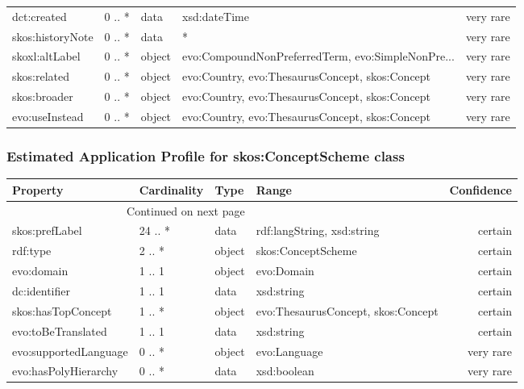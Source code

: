 \documentclass[10pt,a4paper,titlepage,final]{article}
\begin{document}
\begin{tabularx}{\textwidth}{lllXr}
            dct:created &      0 .. * &    data &                                       xsd:dateTime &  very rare \\
       skos:historyNote &      0 .. * &    data &                                                  * &  very rare \\
         skoxl:altLabel &      0 .. * &  object &  evo:CompoundNonPreferredTerm, evo:SimpleNonPre... &  very rare \\
           skos:related &      0 .. * &  object &    evo:Country, evo:ThesaurusConcept, skos:Concept &  very rare \\
           skos:broader &      0 .. * &  object &    evo:Country, evo:ThesaurusConcept, skos:Concept &  very rare \\
         evo:useInstead &      0 .. * &  object &    evo:Country, evo:ThesaurusConcept, skos:Concept &  very rare \\
\end{tabularx}


\subsubsection{Estimated Application Profile for skos:ConceptScheme class}
\begin{tabularx}{\textwidth}{lllXr}
\toprule
              Property & Cardinality &    Type &                               Range & Confidence \\
\midrule
\endhead
\midrule
\multicolumn{3}{r}{{Continued on next page}} \\
\midrule
\endfoot

\bottomrule
\endlastfoot
        skos:prefLabel &     24 .. * &    data &          rdf:langString, xsd:string &    certain \\
              rdf:type &      2 .. * &  object &                  skos:ConceptScheme &    certain \\
            evo:domain &      1 .. 1 &  object &                          evo:Domain &    certain \\
         dc:identifier &      1 .. 1 &    data &                          xsd:string &    certain \\
    skos:hasTopConcept &      1 .. * &  object &  evo:ThesaurusConcept, skos:Concept &    certain \\
    evo:toBeTranslated &      1 .. 1 &    data &                          xsd:string &    certain \\
 evo:supportedLanguage &      0 .. * &  object &                        evo:Language &  very rare \\
  evo:hasPolyHierarchy &      0 .. * &    data &                         xsd:boolean &  very rare \\
\end{tabularx}
\end{document}
